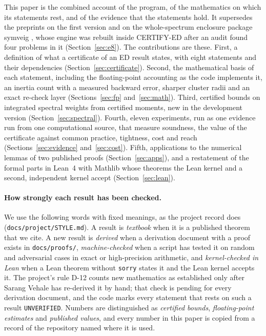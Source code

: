 \documentclass[11pt,a4paper]{article}
\newcommand{\code}[1]{\texttt{#1}}
\begin{document}
This paper is the combined account of the program, of the mathematics on which its statements rest, and of the
evidence that the statements hold. It supersedes the preprints on the first version \cite{CertifyEDv1} and on the
whole-spectrum enclosure package symveig \cite{Symveig}, whose engine was rebuilt inside CERTIFY-ED after an audit
found four problems in it (Section~\ref{sec:e8}). The contributions are these. First, a definition of what a
certificate of an ED result states, with eight statements and their dependencies (Section~\ref{sec:certificate}).
Second, the mathematical basis of each statement, including the floating-point accounting as the code implements it,
an inertia count with a measured backward error, sharper cluster radii and an exact re-check layer
(Sections~\ref{sec:fp} and~\ref{sec:math}). Third, certified bounds on integrated spectral weights from certified
moments, new in the development version (Section~\ref{sec:spectral}). Fourth, eleven experiments, run as one evidence
run from one computational source, that measure soundness, the value of the certificate against common practice,
tightness, cost and reach (Sections~\ref{sec:evidence} and~\ref{sec:cost}). Fifth, applications to the numerical
lemmas of two published proofs (Section~\ref{sec:apps}), and a restatement of the formal parts in Lean~4 with Mathlib
whose theorems the Lean kernel and a second, independent kernel accept (Section~\ref{sec:lean}).

\paragraph{How strongly each result has been checked.}
We use the following words with fixed meanings, as the project record does (\code{docs/project/STYLE.md}). A result
is \emph{textbook} when it is a published theorem that we cite. A new result is \emph{derived} when a derivation
document with a proof exists in \code{docs/proofs/}, \emph{machine-checked} when a script has tested it on random and
adversarial cases in exact or high-precision arithmetic, and \emph{kernel-checked in Lean} when a Lean theorem without
\code{sorry} states it and the Lean kernel accepts it. The project's rule D-12 counts new mathematics as established
only after Sarang Vehale has re-derived it by hand; that check is pending for every derivation document, and the code
marks every statement that rests on such a result \code{UNVERIFIED}. Numbers are distinguished as \emph{certified
bounds}, \emph{floating-point estimates} and \emph{published values}, and every number in this paper is copied from a
record of the repository named where it is used.
\end{document}
